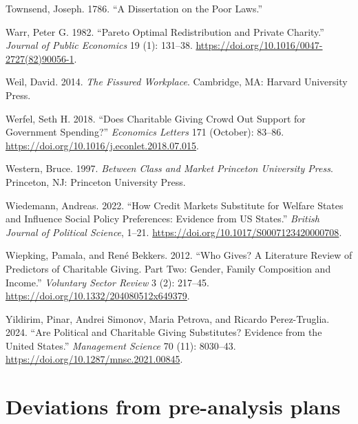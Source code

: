 \documentclass[
  11pt,
  oneside]{article}
\newlength{\cslhangindent}
\newenvironment{CSLReferences}[2] %
 {\begin{list}{}{%
  \setlength{\itemindent}{0pt}
  \setlength{\leftmargin}{0pt}
  \setlength{\parsep}{0pt}
  \ifodd #1
   \setlength{\leftmargin}{\cslhangindent}
   \setlength{\itemindent}{-1\cslhangindent}
  \fi
  \setlength{\itemsep}{#2\baselineskip}}}
 {\end{list}}
\begin{document}
\begin{CSLReferences}{1}{0}
Townsend, Joseph. 1786. {``A {Dissertation} on the {Poor Laws}.''}

Warr, Peter G. 1982. {``Pareto Optimal Redistribution and Private Charity.''} \emph{Journal of Public Economics} 19 (1): 131--38. \url{https://doi.org/10.1016/0047-2727(82)90056-1}.

Weil, David. 2014. \emph{The {Fissured Workplace}}. Cambridge, MA: Harvard University Press.

Werfel, Seth H. 2018. {``Does Charitable Giving Crowd Out Support for Government Spending?''} \emph{Economics Letters} 171 (October): 83--86. \url{https://doi.org/10.1016/j.econlet.2018.07.015}.

Western, Bruce. 1997. \emph{Between {Class} and {Market} {\textbar} {Princeton University Press}}. Princeton, NJ: Princeton University Press.

Wiedemann, Andreas. 2022. {``How {Credit Markets Substitute} for {Welfare States} and {Influence Social Policy Preferences}: {Evidence} from {US States}.''} \emph{British Journal of Political Science}, 1--21. \url{https://doi.org/10.1017/S0007123420000708}.

Wiepking, Pamala, and René Bekkers. 2012. {``Who Gives? {A} Literature Review of Predictors of Charitable Giving. {Part Two}: {Gender}, Family Composition and Income.''} \emph{Voluntary Sector Review} 3 (2): 217--45. \url{https://doi.org/10.1332/204080512x649379}.

Yildirim, Pinar, Andrei Simonov, Maria Petrova, and Ricardo Perez-Truglia. 2024. {``Are {Political} and {Charitable Giving Substitutes}? {Evidence} from the {United States}.''} \emph{Management Science} 70 (11): 8030--43. \url{https://doi.org/10.1287/mnsc.2021.00845}.

\end{CSLReferences}

\newpage

\appendix


\section{Deviations from pre-analysis plans}\label{app-PAP}
\end{document}
